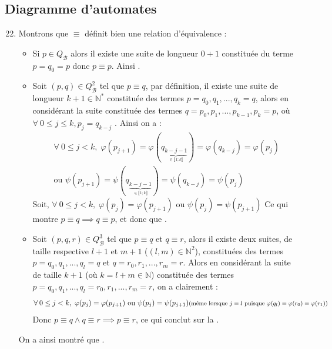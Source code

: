 \documentclass{article}
\newcommand{\bb}[1]{\mathbb{#1}}
\begin{document}
\subsection{Diagramme d'automates}

\begin{enumerate}
    \setcounter{enumi}{21}

    \item Montrons que $\equiv$ définit bien une relation d'équivalence :
        \begin{itemize}
            \item Si $p \in Q_\mathcal{B}$ alors il existe une suite de longueur $0 + 1$ constituée du terme $ p = q_0 = p $ donc $p \equiv p $. Ainsi .
            \item Soit $(p,q) \in Q_\mathcal{B}^2$ tel que $p \equiv q$, par définition, il existe une suite de longueur $k + 1 \in \bb{N^*}$ constituée des termes $p = q_0, q_1,..., q_k = q$, alors en considérant la suite constituée des termes $q = p_0, p_1, ..., p_{k - 1}, p_k = p$, où $ \forall \: 0 \leq j \leq k, p_j = q_{k - j}$ . Ainsi on a : \begin{multline*}
                \forall \: 0 \leq j < k, \; \varphi(p_{j + 1}) = \varphi(q_{\underbrace{k - j - 1}_{\in \llbracket 1 ; k \rrbracket}}) = \varphi(q_{k - j}) = \varphi(p_j) \\
                \text{ou   }  \psi(p_{j + 1}) = \psi(q_{\underbrace{k - j - 1}_{\in \llbracket 1 ; k \rrbracket}}) = \psi(q_{k - j}) = \psi(p_j)
            \end{multline*}
            Soit, $\forall \: 0 \leq j < k, \; \varphi(p_j) = \varphi(p_{j + 1}) \text{ ou } \psi(p_j) = \psi(p_{j + 1})$ \newline
            Ce qui montre $p \equiv q \implies q \equiv p$, et donc que .
            \item Soit $(p, q, r) \in Q_\mathcal{B}^3$ tel que $p \equiv q$ et $q \equiv r$, alors il existe deux suites, de taille respective $l + 1$ et $m + 1$ ($(l, m) \in \bb{N}^2$), constituées des termes $p = q_0, q_1, ... , q_l = q$ et $ q = r_0, r_1, ... , r_m = r$. \newline
            Alors en considérant la suite de taille $ k + 1 $ (où $ k = l + m \in \bb{N}$) constituée des termes \newline
            $p = q_0, q_1, ... , q_l = r_0, r_1, ... , r_m = r$, on a clairement :
            \begin{align*} \forall \: 0 \leq j < k, \; \varphi(p_j) = \varphi(p_{j + 1}) \text{ ou } \psi(p_j) = \psi(p_{j + 1}) \text{\footnotesize{(même lorsque $j = l$ puisque $\varphi(q_l) = \varphi(r_0) = \varphi(r_1)$)}} \end{align*}
            Donc $p \equiv q \land q \equiv r \implies p \equiv r$, ce qui conclut sur la .
        \end{itemize}
        On a ainsi montré que .


\end{enumerate}
\end{document}
